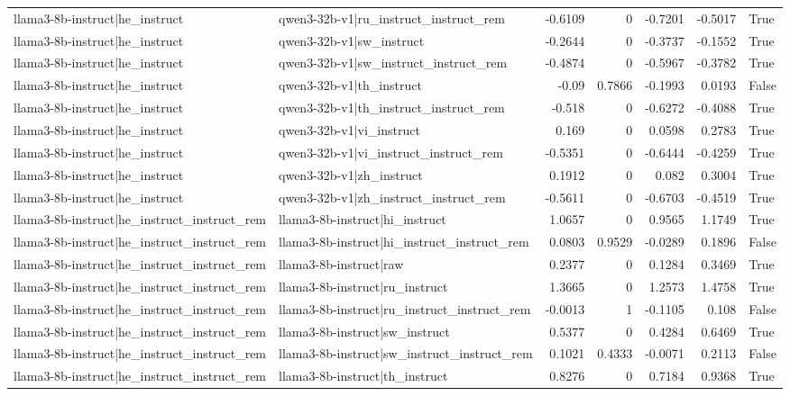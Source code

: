 \begin{table}
\begin{tabular}{l l r r r r l}
llama3-8b-instruct|he_instruct & qwen3-32b-v1|ru_instruct_instruct_rem & -0.6109 & 0 & -0.7201 & -0.5017 & True \\
llama3-8b-instruct|he_instruct & qwen3-32b-v1|sw_instruct & -0.2644 & 0 & -0.3737 & -0.1552 & True \\
llama3-8b-instruct|he_instruct & qwen3-32b-v1|sw_instruct_instruct_rem & -0.4874 & 0 & -0.5967 & -0.3782 & True \\
llama3-8b-instruct|he_instruct & qwen3-32b-v1|th_instruct & -0.09 & 0.7866 & -0.1993 & 0.0193 & False \\
llama3-8b-instruct|he_instruct & qwen3-32b-v1|th_instruct_instruct_rem & -0.518 & 0 & -0.6272 & -0.4088 & True \\
llama3-8b-instruct|he_instruct & qwen3-32b-v1|vi_instruct & 0.169 & 0 & 0.0598 & 0.2783 & True \\
llama3-8b-instruct|he_instruct & qwen3-32b-v1|vi_instruct_instruct_rem & -0.5351 & 0 & -0.6444 & -0.4259 & True \\
llama3-8b-instruct|he_instruct & qwen3-32b-v1|zh_instruct & 0.1912 & 0 & 0.082 & 0.3004 & True \\
llama3-8b-instruct|he_instruct & qwen3-32b-v1|zh_instruct_instruct_rem & -0.5611 & 0 & -0.6703 & -0.4519 & True \\
llama3-8b-instruct|he_instruct_instruct_rem & llama3-8b-instruct|hi_instruct & 1.0657 & 0 & 0.9565 & 1.1749 & True \\
llama3-8b-instruct|he_instruct_instruct_rem & llama3-8b-instruct|hi_instruct_instruct_rem & 0.0803 & 0.9529 & -0.0289 & 0.1896 & False \\
llama3-8b-instruct|he_instruct_instruct_rem & llama3-8b-instruct|raw & 0.2377 & 0 & 0.1284 & 0.3469 & True \\
llama3-8b-instruct|he_instruct_instruct_rem & llama3-8b-instruct|ru_instruct & 1.3665 & 0 & 1.2573 & 1.4758 & True \\
llama3-8b-instruct|he_instruct_instruct_rem & llama3-8b-instruct|ru_instruct_instruct_rem & -0.0013 & 1 & -0.1105 & 0.108 & False \\
llama3-8b-instruct|he_instruct_instruct_rem & llama3-8b-instruct|sw_instruct & 0.5377 & 0 & 0.4284 & 0.6469 & True \\
llama3-8b-instruct|he_instruct_instruct_rem & llama3-8b-instruct|sw_instruct_instruct_rem & 0.1021 & 0.4333 & -0.0071 & 0.2113 & False \\
llama3-8b-instruct|he_instruct_instruct_rem & llama3-8b-instruct|th_instruct & 0.8276 & 0 & 0.7184 & 0.9368 & True \\

\end{tabular}
\end{table}
